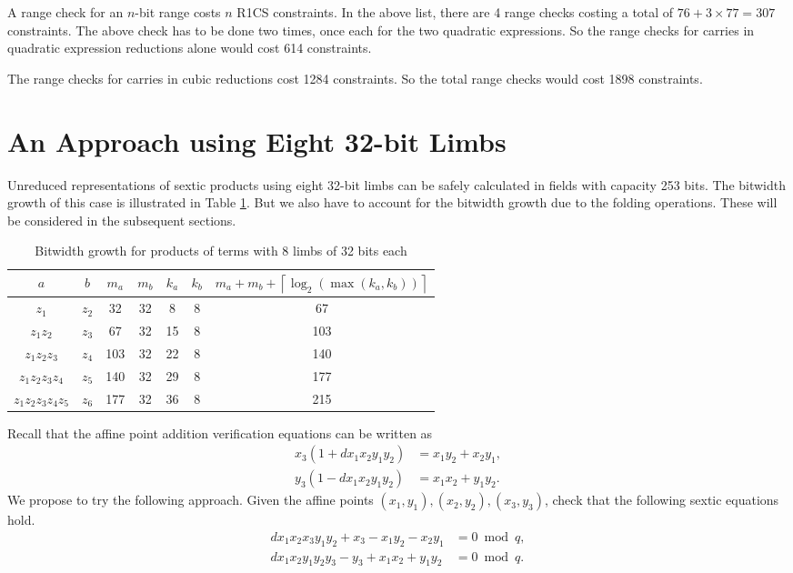 \documentclass[a4paper, 12pt]{article}
\begin{document}
A range check for an $n$-bit range costs $n$ R1CS constraints. In the above list, there are 4 range checks costing a total of $76 + 3 \times 77 = 307$ constraints. The above check has to be done two times, once each for the two quadratic expressions. So the range checks for carries in quadratic expression reductions alone would cost 614 constraints.

The range checks for carries in cubic reductions cost 1284 constraints. So the total range checks would cost 1898 constraints.
\section{An Approach using Eight 32-bit Limbs}%
\label{sec:an_approach_using_eight_32_bit_limbs}
Unreduced representations of sextic products using eight 32-bit limbs can be safely calculated in fields with capacity 253 bits. The bitwidth growth of this case is illustrated in Table \ref{tab:limb32}. But we also have to account for the bitwidth growth due to the folding operations. These will be considered in the subsequent sections.
\begin{table}[h]
  \centering
  \begin{tabular}{c|c|c|c|c|c|c}
    $a$ & $b$ & $m_a$ & $m_b$ & $k_a$ & $k_b$ & $m_a+m_b+\left\lceil \log_2 \left( \max\left( k_a, k_b \right) \right) \right\rceil$ \\ \hline
    $z_1$ & $z_2$ & 32 & 32 & 8 & 8 & 67 \\ \hline
    $z_1z_2$ & $z_3$ & 67 & 32 & 15 & 8 & 103 \\ \hline
    $z_1z_2z_3$ & $z_4$ & 103 & 32 & 22 & 8 & 140 \\ \hline
    $z_1z_2z_3z_4$ & $z_5$ & 140 & 32 & 29 & 8 & 177 \\ \hline
    $z_1z_2z_3z_4z_5$ & $z_6$ & 177 & 32 & 36 & 8 & 215 \\ \hline
  \end{tabular}
  \caption{Bitwidth growth for products of terms with 8 limbs of 32 bits each}
  \label{tab:limb32}
\end{table}

Recall that the affine point addition verification equations can be written as
\begin{align}
  x_3(1+dx_1x_2y_1y_2) &= x_1y_2 + x_2y_1,\\
  y_3(1-dx_1x_2y_1y_2) &= x_1x_2 + y_1y_2.
  \label{eqn:additionAffineVerificationLimbs8}
\end{align}
We propose to try the following approach. Given the affine points $(x_1, y_1), (x_2, y_2), (x_3, y_3)$, check that the following sextic equations hold.
\begin{align}
  dx_1x_2x_3y_1y_2 + x_3 - x_1y_2 - x_2y_1 &= 0 \bmod q,\label{eqn1}\\
  dx_1x_2y_1y_2y_3 - y_3 + x_1x_2 + y_1y_2 &= 0 \bmod q.\label{eqn2}
\end{align}
\end{document}
